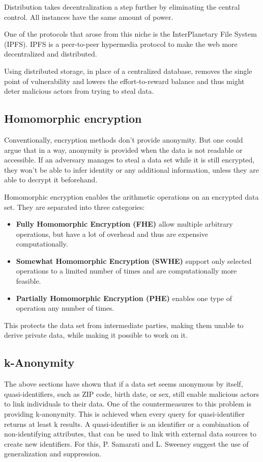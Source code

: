Distribution takes decentralization a step further by eliminating the central control. All instances have the same amount of power.

One of the protocols that arose from this niche is the InterPlanetary File System (IPFS). IPFS is a peer-to-peer hypermedia protocol to make the web more decentralized and distributed.

Using distributed storage, in place of a centralized database, removes the single point of vulnerability and lowers the effort-to-reward balance and thus might deter malicious actors from trying to steal data.

\subsection{Homomorphic encryption}
Conventionally, encryption methods don't provide anonymity. But one could argue that in a way, anonymity is provided when the data is not readable or accessible. If an adversary manages to steal a data set while it is still encrypted, they won't be able to infer identity or any additional information, unless they are able to decrypt it beforehand. 

Homomorphic encryption enables the arithmetic operations on an encrypted data set. They are separated into three categories:
\begin{itemize}
    \item \textbf{Fully Homomorphic Encryption (FHE)} allow multiple arbitrary operations, but have a lot of overhead and thus are expensive computationally.
    \item \textbf{Somewhat Homomorphic Encryption (SWHE)} support only selected operations to a limited number of times and are computationally more feasible.
    \item \textbf{Partially Homomorphic Encryption (PHE)} enables one type of operation any number of times.
\end{itemize}

This protects the data set from intermediate parties, making them unable to derive private data, while making it possible to work on it.

\subsection{k-Anonymity}
The above sections have shown that if a data set seems anonymous by itself, quasi-identifiers, such as ZIP code, birth date, or sex, still enable malicious actors to link individuals to their data. One of the countermeasures to this problem is providing k-anonymity. This is achieved when every query for quasi-identifier returns at least k results. A quasi-identifier is an identifier or a combination of non-identifying attributes, that can be used to link with external data sources to create new identifiers. For this, P. Samarati and L. Sweeney suggest the use of generalization and suppression.


